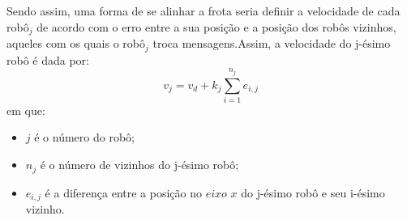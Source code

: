 Sendo assim, uma forma de se alinhar a frota seria definir a velocidade de cada robô$_{j}$ de acordo com o erro entre a sua posição e a posição dos robôs vizinhos, aqueles com os quais o robô$_{j}$ troca mensagens.Assim, a velocidade do j-ésimo robô é dada por:
\begin{equation}
	v_{j} = v_{d} + k_{j} \sum\limits_{i = 1}^{n_{j}} e_{i,j}
	\label{eq:velP1}
\end{equation}
em que:
\begin{itemize}
	\item $j$ é o número do robô;
	\item $n_{j}$ é o número de vizinhos do j-ésimo robô;
	\item $e_{i,j}$ é a diferença entre a posição no $eixo$ $x$ do j-ésimo robô e seu i-ésimo vizinho.
\end{itemize}

